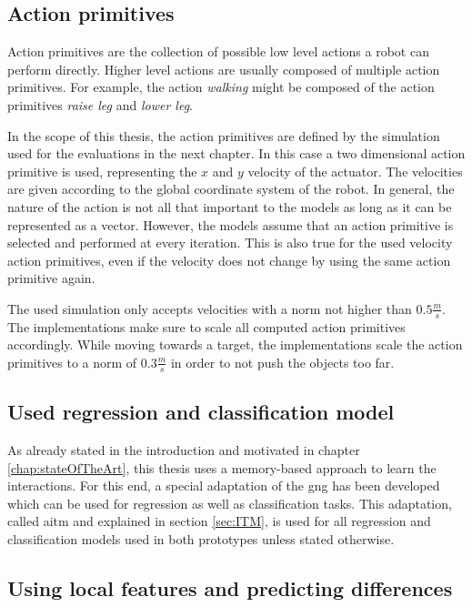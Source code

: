 \subsection{Action primitives}

Action primitives are the collection of possible low level actions a robot can perform directly. Higher level actions are usually composed of multiple action primitives. For example, the action \textit{walking} might be composed of the action primitives \textit{raise leg} and \textit{lower leg}.

In the scope of this thesis, the action primitives are defined by the simulation used for the evaluations in the next chapter. In this case a two dimensional action primitive is used, representing the $x$ and $y$ velocity of the actuator. The velocities are given according to the global coordinate system of the robot. 
In general, the nature of the action is not all that important to the models as long as it can be represented as a vector. 
However, the models assume that an action primitive is selected and performed at every iteration. This is also true for the used velocity action primitives, even if the velocity does not change by using the same action primitive again. 

The used simulation only accepts velocities with a norm not higher than $0.5\frac{m}{s}$. The implementations make sure to scale all computed action primitives accordingly. While moving towards a target, the implementations scale the action primitives to a norm of $0.3\frac{m}{s}$ in order to not push the objects too far.

\subsection{Used regression and classification model}

As already stated in the introduction and motivated in chapter \ref{chap:stateOfTheArt}, this thesis uses a memory-based approach to learn the interactions. For this end, a special adaptation of the \gls{gng} has been developed which can be used for regression as well as classification tasks. This adaptation, called \acrfull{aitm} and explained in section \ref{sec:ITM}, is used for all regression and classification models used in both prototypes unless stated otherwise. 

\subsection{Using local features and predicting differences \label{sec:localFeatures}}

